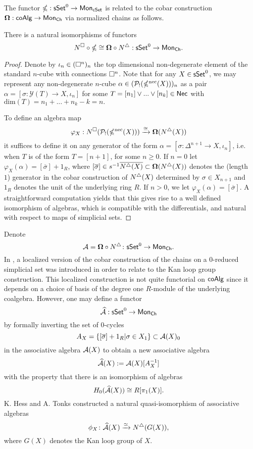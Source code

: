 The functor $\mathbb{\Omega}: \mathsf{sSet}^0 \to \mathsf{Mon}_{\mathsf{cSet}}$ is related to the cobar construction $\mathbf{\Omega}: \mathsf{coAlg} \to \mathsf{Mon}_{\mathsf{Ch}}$ via normalized chains as follows.

\begin{proposition} \label{gcobarandcobar}
There is a natural isomorphisms of functors 
$$N^{\square} \circ \mathbb{\Omega} \cong \mathbf{\Omega} \circ N^{\triangle}: \mathsf{sSet}^0 \to \mathsf{Mon}_{\mathsf{Ch}}.$$
\end{proposition}

\begin{proof} 
Denote by $\iota_n \in (\square^n)_n$ the top dimensional non-degenerate element of the standard $n$-cube with connections $\square^n$. Note that for any $X \in \mathsf{sSet}^0$, we may represent any non-degenerate $n$-cube $\alpha \in (\mathcal{P}_!(\mathbb{\Omega}^{\text{nec}}(X)))_n$ as a pair $\alpha=[\sigma: \mathcal{Y}(T) \to X, \iota_n]$ for some $T=[n_1] \vee ... \vee [n_k] \in \mathsf{Nec}$ with $\text{dim}(T)=n_1+ ...+n_k-k=n.$

To define an algebra map
$$\varphi_X: N^{\square}(\mathcal{P}_!(\mathbb{\Omega}^{\text{nec}}(X))) \xrightarrow{\cong} \mathbf{\Omega}(N^{\triangle}(X))$$
it suffices to define it on any generator of the form $\alpha=[\sigma \colon \Delta^{n+1} \to X, \iota_{n}]$, i.e. when $T$ is of the form $T=[n+1]$, for some $n\geq0$. If $n=0$ let $\varphi_X(\alpha)= [\overline{\sigma}]+ 1_R$, where $[\overline{\sigma}] \in s^{-1} \overline{ N^{\triangle}(X)} \subset \mathbf{\Omega}(N^{\triangle}(X))$ denotes the (length $1$) generator in the cobar construction of $N^{\triangle}(X)$ determined by $\sigma \in X_{n+1}$ and $1_R$ denotes the unit of the underlying ring $R$. If $n>0$, we let $\varphi_X(\alpha)=[\overline{\sigma}]$. A straightforward computation yields that this gives rise to a well defined isomorphism of algebras, which is compatible with the differentials, and natural with respect to maps of simplicial sets.  
\end{proof}
Denote $$\mathcal{A}= \mathbf{\Omega} \circ N^{\triangle} \colon \mathsf{sSet}^0 \to \mathsf{Mon}_{\mathsf{Ch}}.$$ In \cite{hess2010cobar}, a localized version of the cobar construction of the chains on a $0$-reduced simplicial set was introduced in order to relate to the Kan loop group construction. This localized construction is not quite functorial on $\mathsf{coAlg}$ since it depends on a choice of basis of the degree one $R$-module of the underlying coalgebra. However, one may define a functor $$\widehat{\mathcal{A}}: \mathsf{sSet}^0 \to \mathsf{Mon}_{\mathsf{Ch}}$$
by formally inverting the set of $0$-cycles $$A_X=\{ [\overline{\sigma}]+1_R | \sigma \in X_1 \} \subset \mathcal{A}(X)_0$$ in the associative algebra $\mathcal{A}(X)$ to obtain a new associative algebra
$$\widehat{\mathcal{A}}(X):= \mathcal{A}(X)[A_X^{-1}]$$
with the property that there is an isomorphism of algebras $$H_0(\widehat{\mathcal{A}}(X)) \cong R[\pi_1(X)].$$
K. Hess and A. Tonks constructed a natural quasi-isomorphism of associative algebras $$\phi_{X} \colon \widehat{\mathcal{A}}(X)\xrightarrow{\simeq} N^{\triangle}(G(X)),$$ where $G(X)$ denotes the Kan loop group of $X$. 

